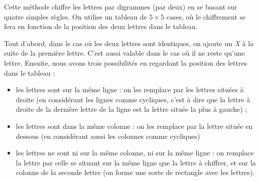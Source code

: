 Cette méthode chiffre les lettres par digrammes (par deux) en se
basant sur quatre simples règles. On utilise un tableau de $5
\times 5$ cases,
où le chiffrement se fera en fonction de la position des deux lettres
dans le tableau.  

Tout d'abord, dans le cas où les deux lettres sont
identiques, on ajoute un \emph{X} à la suite de la première
lettre. C'est aussi valable dans le cas où il ne reste qu'une lettre.
Ensuite, nous avons trois possibilités en regardant la position des
lettres dans le tableau : 
\begin{itemize}
  \item les lettres sont sur la même ligne : on les remplace par les
    lettres situées à droite (en considérant les lignes comme
    cycliques, c'est à dire que la lettre à droite de la dernière
    lettre de la ligne est la lettre située la plus à gauche) ; 
  \item les lettres sont dans la même colonne : on les remplace par la
    lettre située en dessous (en considérant aussi les colonnes comme
    cycliques)
  \item les lettres ne sont ni sur la même colonne, ni sur la même
    ligne : on remplace la lettre par celle se situant sur la même
    ligne que la lettre à chiffrer, et sur la colonne de la seconde
    lettre (on forme une sorte de rectangle avec les lettres).
\end{itemize}

